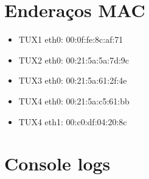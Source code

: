 \documentclass[11pt,a4paper,reqno]{report}
\numberwithin{equation}{section}
\begin{document}


\begin{appendices}

\chapter{Enderaços MAC}

\begin{itemize} 
\item TUX1 eth0: 00:0f:fe:8c:af:71
\item TUX2 eth0: 00:21:5a:5a:7d:9c
\item TUX3 eth0: 00:21:5a:61:2f:4e
\item TUX4 eth0: 00:21:5a:c5:61:bb
\item TUX4 eth1: 00:c0:df:04:20:8c
\end{itemize}

\chapter{Console logs}


\end{appendices}
\end{document}
